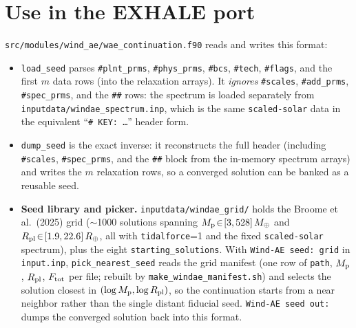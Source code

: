 \documentclass[english,a4paper]{my_memo}
\newcommand{\code}[1]{\texttt{#1}}
\newcommand{\Rp}{R_{\rm pl}}
\newcommand{\Ftot}{F_{\rm tot}}
\newcommand{\hd}[1]{\code{\##1}}      %
\begin{document}
\section{Use in the EXHALE port}
\code{src/modules/wind\_ae/wae\_continuation.f90} reads and writes this
format:
\begin{itemize}\itemsep2pt
  \item \code{load\_seed} parses \hd{plnt\_prms}, \hd{phys\_prms},
        \hd{bcs}, \hd{tech}, \hd{flags}, and the first $m$ data rows (into
        the relaxation arrays). It \emph{ignores} \hd{scales},
        \hd{add\_prms}, \hd{spec\_prms}, and the \code{\#\#} rows: the
        spectrum is loaded separately from
        \code{inputdata/windae\_spectrum.inp}, which is the same
        \code{scaled-solar} data in the equivalent
        ``\code{\# KEY: \dots}'' header form.
  \item \code{dump\_seed} is the exact inverse: it reconstructs the full
        header (including \hd{scales}, \hd{spec\_prms}, and the
        \code{\#\#} block from the in-memory spectrum arrays) and writes
        the $m$ relaxation rows, so a converged solution can be banked as a
        reusable seed.
  \item \textbf{Seed library and picker.} \code{inputdata/windae\_grid/}
        holds the Broome et al.\ (2025) grid ($\sim$1000 solutions spanning
        $M_{\rm p}\!\in\![3,528]\,M_\oplus$ and
        $\Rp\!\in\![1.9,22.6]\,R_\oplus$, all with \code{tidalforce}=1 and
        the fixed \code{scaled-solar} spectrum), plus the eight
        \code{starting\_solutions}. With \code{Wind-AE seed: grid} in
        \code{input.inp}, \code{pick\_nearest\_seed} reads the grid manifest
        (one row of \code{path}, $M_{\rm p}$, $\Rp$, $\Ftot$ per file;
        rebuilt by \code{make\_windae\_manifest.sh}) and selects the
        solution closest in $(\log M_{\rm p},\log\Rp)$, so the continuation
        starts from a near neighbor rather than the single distant fiducial
        seed. \code{Wind-AE seed out:} dumps the converged solution back
        into this format.
\end{itemize}
\end{document}
